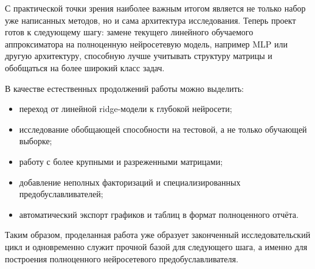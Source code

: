 \documentclass[12pt,a4paper]{article}
\begin{document}
С практической точки зрения наиболее важным итогом является не только набор уже написанных методов, но и сама архитектура исследования. Теперь проект готов к следующему шагу: замене текущего линейного обучаемого аппроксиматора на полноценную нейросетевую модель, например MLP или другую архитектуру, способную лучше учитывать структуру матрицы и обобщаться на более широкий класс задач.

В качестве естественных продолжений работы можно выделить:
\begin{itemize}[leftmargin=*]
    \item переход от линейной ridge-модели к глубокой нейросети;
    \item исследование обобщающей способности на тестовой, а не только обучающей выборке;
    \item работу с более крупными и разреженными матрицами;
    \item добавление неполных факторизаций и специализированных предобуславливателей;
    \item автоматический экспорт графиков и таблиц в формат полноценного отчёта.
\end{itemize}

Таким образом, проделанная работа уже образует законченный исследовательский цикл и одновременно служит прочной базой для следующего шага, а именно для построения полноценного нейросетевого предобуславливателя.
\end{document}
